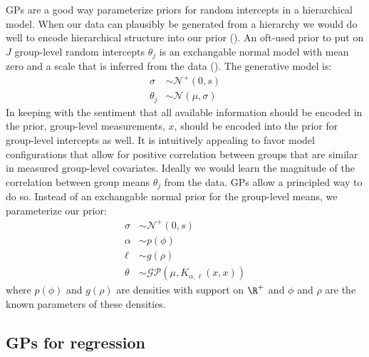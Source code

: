 \documentclass{article}
\begin{document}
GPs are a good way parameterize priors for random intercepts in a hierarchical
model. When our data can plausibly be generated from a hierarchy we would do
well to encode hierarchical structure into our prior (\citet{}). An
oft-used prior to put on $J$ group-level random intercepts $\theta_j$ is
an exchangable normal model with mean zero and a scale that is inferred from
the data (\citet{gelman2014bayesian}). The generative model is: 
%
\begin{align*}
  \sigma & \sim \mathcal{N}^+(0, s) \\
  \theta_j & \sim \mathcal{N}(\mu, \sigma)
\end{align*}
%
In keeping with the sentiment that all available information should be encoded
in the prior, group-level measurements, $x$, should be encoded into the prior for
group-level intercepts as well. It is intuitively appealing to favor model
configurations that allow for positive correlation between groups that are
similar in measured group-level covariates. Ideally we would learn the 
magnitude of the correlation between group means $\theta_j$ from the
data. GPs allow a principled way to do so. Instead of an exchangable normal
prior for the group-level means, we parameterize our prior:
%
\begin{align*}
  \sigma & \sim \mathcal{N}^+(0, s) \\
  \alpha & \sim p(\phi) \\
  \ell & \sim g(\rho) \\
  \theta & \sim \mathcal{GP}(\mu, K_{\alpha, \ell}(x, x))
\end{align*}
%
where $p(\phi)$ and $g(\rho)$ are densities with support on $\R^+$ and $\phi$
and $\rho$ are the known parameters of these densities.

\subsection{GPs for regression}
\end{document}
